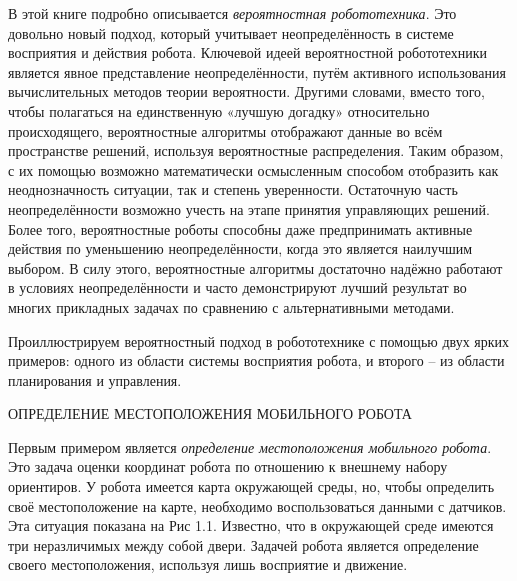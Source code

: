 \documentclass[10pt,a4paper]{article}
\begin{document}
В этой книге подробно описывается \textit{вероятностная робототехника}. Это довольно новый подход, который учитывает неопределённость в системе восприятия и действия робота. Ключевой идеей вероятностной робототехники является явное представление неопределённости, путём активного использования вычислительных методов теории вероятности. Другими словами, вместо того, чтобы полагаться на единственную «лучшую догадку» относительно происходящего, вероятностные алгоритмы отображают данные во всём пространстве решений, используя вероятностные распределения. Таким образом, с их помощью возможно математически осмысленным способом отобразить как неоднозначность ситуации, так и степень уверенности. Остаточную часть неопределённости возможно учесть на этапе принятия управляющих решений. Более того, вероятностные роботы способны даже предпринимать активные действия по уменьшению неопределённости, когда это является наилучшим выбором. В силу этого, вероятностные алгоритмы достаточно надёжно работают в условиях неопределённости и часто демонстрируют лучший результат во многих прикладных задачах по сравнению с альтернативными методами.
 
Проиллюстрируем вероятностный подход в робототехнике с помощью двух ярких примеров: одного из области системы восприятия робота, и второго – из области планирования и управления.

ОПРЕДЕЛЕНИЕ МЕСТОПОЛОЖЕНИЯ МОБИЛЬНОГО РОБОТА

Первым примером является \textit{определение местоположения мобильного робота}. Это задача оценки координат робота по отношению к внешнему набору ориентиров. У робота имеется карта окружающей среды, но, чтобы определить своё местоположение на карте, необходимо воспользоваться данными с датчиков. Эта ситуация показана на Рис 1.1. Известно, что в окружающей среде имеются три неразличимых между собой двери. Задачей робота является определение своего местоположения, используя лишь восприятие и движение.
\end{document}

